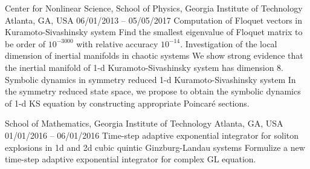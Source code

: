 


\begin{cventries}
  \cvresearch
  {Center for Nonlinear Science, School of Physics, Georgia Institute of Technology}
  {Atlanta, GA, USA}
  {06/01/2013 -- 05/05/2017}
  {
    \cvresearchitem
    {Computation of Floquet vectors in Kuramoto-Sivashinsky system}
    {Find the smallest eigenvalue of Floquet matrix to be order of $10^{-3000}$ with relative accuracy $10^{-14}$.}
    \cvresearchitem
    {Investigation of the local dimension of inertial manifolds in chaotic systems}
    {We show strong evidence that the inertial manifold of 1-d Kuramoto-Sivashinsky system has dimension 8.}
    \cvresearchitem
    {Symbolic dynamics in symmetry reduced 1-d Kuramoto-Sivashinsky system}
    {In the symmetry reduced state space, we propose to obtain the symbolic dynamics of 1-d KS equation by constructing appropriate Poincar\'e sections.}
  }

  \cvresearch
  {School of Mathematics, Georgia Institute of Technology} 
  {Atlanta, GA, USA}
  {01/01/2016 -- 06/01/2016} 
  {
    \cvresearchitem
    {Time-step adaptive exponential integrator for soliton explosions in 1d and 2d cubic quintic Ginzburg-Landau systems}
    {Formulize a new time-step adaptive exponential integrator for complex GL equation.}
  }


\end{cventries}
